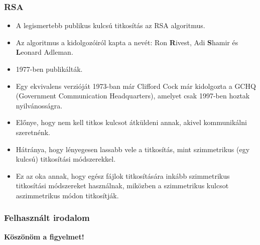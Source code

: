 \documentclass{beamer}
\begin{document}
\begin{frame}
    \frametitle{RSA}

    \begin{itemize}
        \item A legismertebb publikus kulcsú titkosítás az RSA algoritmus.
        \item Az algoritmus a kidolgozóiról kapta a nevét: Ron \textbf{R}ivest, Adi \textbf{S}hamir és \textbf{L}eonard Adleman.
        \item 1977-ben publikálták.
        \item Egy ekvivalens verzióját 1973-ban már Clifford Cock már kidolgozta a GCHQ (Government Communication Headquarters),
              amelyet csak 1997-ben hoztak nyilvánosságra.
        \item Előnye, hogy nem kell titkos kulcsot átküldeni annak, akivel kommunikálni szeretnénk.
        \item Hátránya, hogy lényegesen lassabb vele a titkosítás, mint szimmetrikus (egy kulcsú) titkosítási módszerekkel.
        \item Ez az oka annak, hogy egész fájlok titkosítására inkább szimmetrikus titkosítási módszereket használnak, miközben
              a szimmetrikus kulcsot aszimmetrikus módon titkosítják.
    \end{itemize}
\end{frame}

\begin{frame}
    \frametitle{Felhasznált irodalom}

    \printbibliography[heading=bibintoc]
\end{frame}

\begin{frame}
    \Huge
    \textbf{Köszönöm a figyelmet!}
\end{frame}
\end{document}
